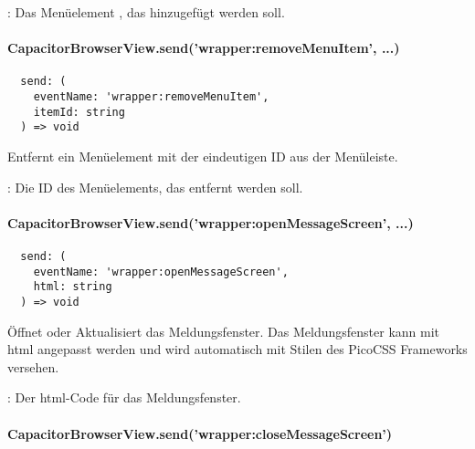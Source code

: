 \begin{arguments}
  \item {}: Das Menüelement , das hinzugefügt werden soll.
\end{arguments}


\paragraph{CapacitorBrowserView.send('wrapper:removeMenuItem', ...)}

\begin{verbatim}
  send: (
    eventName: 'wrapper:removeMenuItem',
    itemId: string
  ) => void
\end{verbatim}

Entfernt ein Menüelement mit der eindeutigen ID  aus der Menüleiste.

\begin{arguments}
  \item {}: Die ID des Menüelements, das entfernt werden soll.
\end{arguments}


\paragraph{CapacitorBrowserView.send('wrapper:openMessageScreen', ...)}

\begin{verbatim}
  send: (
    eventName: 'wrapper:openMessageScreen',
    html: string
  ) => void
\end{verbatim}

Öffnet oder Aktualisiert das Meldungsfenster.
Das Meldungsfenster kann mit \ac{html} angepasst werden und wird automatisch mit Stilen des PicoCSS Frameworks versehen.

\begin{arguments}
  \item {}: Der \ac{html}-Code für das Meldungsfenster.
\end{arguments}


\newpage

\paragraph{CapacitorBrowserView.send('wrapper:closeMessageScreen')}

